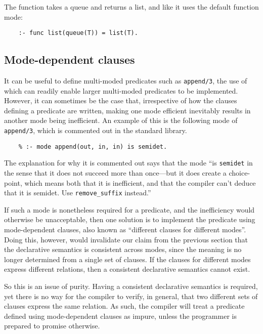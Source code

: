 The  function takes a queue and returns a list,
and like  it uses the default function mode:
\begin{verbatim}
    :- func list(queue(T)) = list(T).
\end{verbatim}


\subsection{Mode-dependent clauses}
\label{sec:mode-dependent}

It can be useful to define
multi-moded predicates such as \texttt{append/3},
the use of which can readily enable
larger multi-moded predicates to be implemented.
However,
it can sometimes be the case that,
irrespective of how the clauses defining a predicate are written,
making one mode efficient inevitably results in
another mode being inefficient.
An example of this is the following mode of \texttt{append/3},
which is commented out in the standard library.
\begin{verbatim}
    % :- mode append(out, in, in) is semidet.
\end{verbatim}
The explanation for why it is commented out says that the mode
``is \texttt{semidet} in the sense that it does not
succeed more than once---but it does create a choice-point, which means
both that it is inefficient, and that the compiler can't deduce that
it is semidet. Use \texttt{remove\_suffix} instead.''

If such a mode is nonetheless required for a predicate,
and the inefficiency would otherwise be unacceptable,
then one solution is to implement the predicate
using mode-dependent clauses,
also known as ``different clauses for different modes''.
Doing this, however,
would invalidate our claim from the previous section
that the declarative semantics is consistent across modes,
since the meaning is no longer determined from a single set of clauses.
If the clauses for different modes express different relations,
then a consistent declarative semantics cannot exist.

So this is an issue of purity.
Having a consistent declarative semantics is required,
yet there is no way for the compiler to verify, in general,
that two different sets of clauses express the same relation.
As such,
the compiler will treat a predicate
defined using mode-dependent clauses as impure,
unless the programmer is prepared to promise otherwise.

